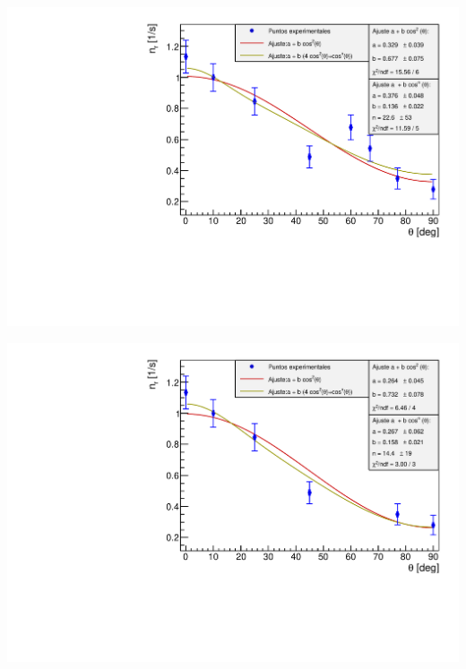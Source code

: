 \documentclass[11pt]{article}
\begin{document}
\begin{minipage}[t]{0.47\linewidth}
	\label{Fig:angulo3}
	\begin{center}
	\includegraphics[width=0.99\linewidth]{../Graficas/Angulos_3.pdf}
	\end{center}
\end{minipage}
\hfill
\begin{minipage}[t]{0.47\linewidth}
	\label{Fig:angulo4}
	\begin{center}
	\includegraphics[width=0.99\linewidth]{../Graficas/Angulos_4.pdf}
	\end{center}
\end{minipage}
\end{document}
